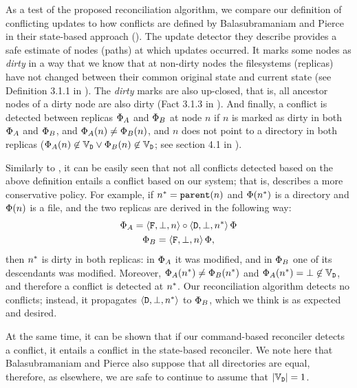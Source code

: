 As a test of the proposed reconciliation algorithm, 
we compare our definition of conflicting
updates to how conflicts are defined by Balasubramaniam and Pierce
in their state-based approach (\cite{BP}).
The update detector they describe provides a safe estimate of nodes
(paths) at which updates occurred.
It marks some nodes as \emph{dirty} in a way that we know that at non-dirty nodes
the filesystems (replicas) have not changed between their common original state and current state
(see Definition 3.1.1 in \cite{BP}).
The \emph{dirty} marks are also up-closed, that is, all ancestor nodes of a dirty node
are also dirty (Fact 3.1.3 in \cite{BP}).
And finally, a conflict is detected between replicas $\Phi_A$ and $\Phi_B$ at node $n$
if $n$ is marked as dirty in both $\Phi_A$ and $\Phi_B$, and
$\Phi_A(n)\neq\Phi_B(n)$, and $n$ does not point to a directory in both replicas
($\Phi_A(n)\not\in\mathbb{V}_{\mathtt{D}} \vee \Phi_B(n)\not\in\mathbb{V}_{\mathtt{D}}$; see section 4.1 in \cite{BP}).

Similarly to \cite{NREC},
it can be easily seen that not all conflicts detected based on the above definition
entails a conflict based on our system; that is, \cite{BP} describes a more
conservative policy.
For example, if $n^*=\mathtt{parent}(n)$ and $\Phi(n^*)$ is a directory and $\Phi(n)$ is a file, and
the two replicas are derived in the following way:
\begin{gather*}
\Phi_A = \langle{\mathtt{F},\bot,n}\rangle \circ \langle{\mathtt{D},\bot,n^*}\rangle \,\Phi \\
\Phi_B = \langle{\mathtt{F},\bot,n}\rangle \,\Phi,
\end{gather*}
then $n^*$ is dirty in both replicas:
in $\Phi_A$ it was modified, and in $\Phi_B$ one of its descendants was modified.
Moreover, $\Phi_A(n^*)\neq\Phi_B(n^*)$ and $\Phi_A(n^*)=\bot\not\in\mathbb{V}_{\mathtt{D}}$,
and therefore a conflict is detected at $n^*$.
Our reconciliation algorithm detects no conflicts;
instead, it propagates $\langle{\mathtt{D},\bot,n^*}\rangle$ to $\Phi_B$, which we think is as expected
and desired.

At the same time, it can be shown that if our command-based reconciler
detects a conflict, it entails a conflict in the state-based reconciler.
We note here that Balasubramaniam and Pierce also suppose that all directories are equal,
therefore, as elsewhere, we are safe to continue to assume that $|\mathbb{V}_{\mathtt{D}}|=1$.

